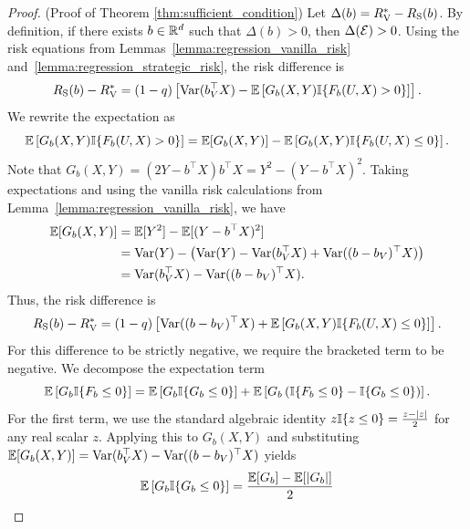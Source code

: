 \begin{proof}(Proof of Theorem \ref{thm:sufficient_condition})\label{proof:sufficient_condition}\label{app:proof_sufficient_condition}
Let $\Delta(b) = R_{\mathrm{V}}^* - R_{\mathrm{S}}(b)$. By definition, if there exists $b \in \mathbb{R}^d$ such that $\Delta(b) > 0$, then $\Delta(\mathcal{E}) > 0$. Using the risk equations from Lemmas~\ref{lemma:regression_vanilla_risk} and~\ref{lemma:regression_strategic_risk}, the risk difference is
\begin{equation*}
    R_{\mathrm{S}}(b) - R_{\mathrm{V}}^* = (1 - q) \left[ \mathrm{Var}(b_V^\top X) - \mathbb{E}\left[ G_b(X, Y) \mathbb{I}\{F_b(U, X) > 0\} \right] \right].
\end{equation*}
We rewrite the expectation as
\begin{equation*}
    \mathbb{E}\left[ G_b(X, Y) \mathbb{I}\{F_b(U, X) > 0\} \right] = \mathbb{E}[G_b(X, Y)] - \mathbb{E}\left[ G_b(X, Y) \mathbb{I}\{F_b(U, X) \le 0\} \right].
\end{equation*}
Note that $G_b(X, Y) = (2Y - b^\top X)b^\top X = Y^2 - (Y - b^\top X)^2$. Taking expectations and using the vanilla risk calculations from Lemma~\ref{lemma:regression_vanilla_risk}, we have
\begin{align*}
    \mathbb{E}[G_b(X, Y)] &= \mathbb{E}[Y^2] - \mathbb{E}[(Y - b^\top X)^2] \nonumber \\
    &= \mathrm{Var}(Y) - \left( \mathrm{Var}(Y) - \mathrm{Var}(b_V^\top X) + \mathrm{Var}((b - b_V)^\top X) \right) \nonumber \\
    &= \mathrm{Var}(b_V^\top X) - \mathrm{Var}((b - b_V)^\top X).
\end{align*}
Thus, the risk difference is
\begin{equation*}
    R_{\mathrm{S}}(b) - R_{\mathrm{V}}^* = (1 - q) \left[ \mathrm{Var}((b - b_V)^\top X) + \mathbb{E}\left[ G_b(X, Y) \mathbb{I}\{F_b(U, X) \le 0\} \right] \right].
\end{equation*}
For this difference to be strictly negative, we require the bracketed term to be negative.
We decompose the expectation term
\begin{equation*}
    \mathbb{E}\left[ G_b \mathbb{I}\{F_b \le 0\} \right] = \mathbb{E}\left[ G_b \mathbb{I}\{G_b \le 0\} \right] + \mathbb{E}\left[ G_b \left( \mathbb{I}\{F_b \le 0\} - \mathbb{I}\{G_b \le 0\} \right) \right].
\end{equation*}
For the first term, we use the standard algebraic identity $z \mathbb{I}\{z \le 0\} = \frac{z - |z|}{2}$ for any real scalar $z$. Applying this to $G_b(X, Y)$ and substituting $\mathbb{E}[G_b(X, Y)] = \mathrm{Var}(b_V^\top X) - \mathrm{Var}((b - b_V)^\top X)$ yields
\begin{align}
    \E\left[ G_b \I{G_b \le 0} \right] &= \frac{\E[G_b] - \E[|G_b|]}{2} \nonumber \\

\end{align}
\end{proof}
